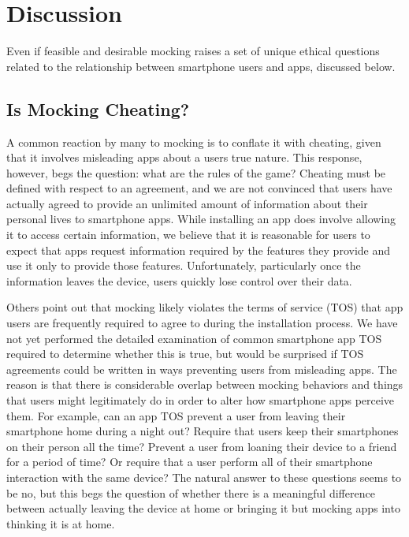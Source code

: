 \section{Discussion}
\label{sec-discussion}

Even if feasible and desirable mocking raises a set of unique ethical
questions related to the relationship between smartphone users and apps,
discussed below.

\subsection{Is Mocking Cheating?}

A common reaction by many to mocking is to conflate it with cheating, given
that it involves misleading apps about a users true nature. This response,
however, begs the question: what are the rules of the game? Cheating must be
defined with respect to an agreement, and we are not convinced that users
have actually agreed to provide an unlimited amount of information about
their personal lives to smartphone apps. While installing an app does involve
allowing it to access certain information, we believe that it is reasonable
for users to expect that apps request information required by the features
they provide and use it only to provide those features. Unfortunately,
particularly once the information leaves the device, users quickly lose
control over their data.

Others point out that mocking likely violates the terms of service (TOS) that
app users are frequently required to agree to during the installation
process. We have not yet performed the detailed examination of common
smartphone app TOS required to determine whether this is true, but would be
surprised if TOS agreements could be written in ways preventing users from
misleading apps. The reason is that there is considerable overlap between
mocking behaviors and things that users might legitimately do in order to
alter how smartphone apps perceive them. For example, can an app TOS prevent
a user from leaving their smartphone home during a night out? Require that
users keep their smartphones on their person all the time? Prevent a user
from loaning their device to a friend for a period of time? Or require that a
user perform all of their smartphone interaction with the same device? The
natural answer to these questions seems to be no, but this begs the question
of whether there is a meaningful difference between actually leaving the
device at home or bringing it but mocking apps into thinking it is at home.


